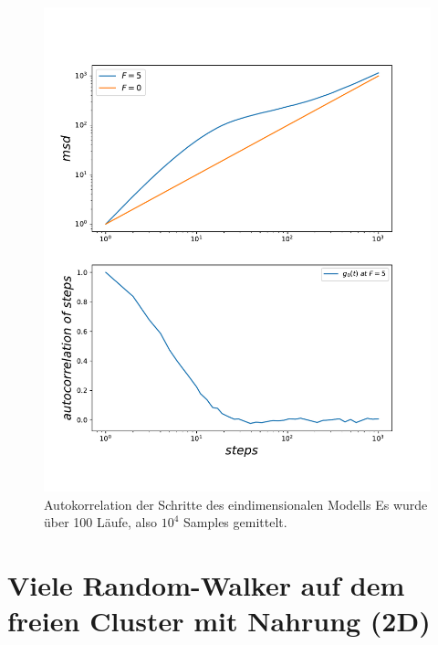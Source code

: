 \documentclass[a4paper, 12pt]{report}
\begin{document}
\begin{figure}[H]
	\centering
	\includegraphics[scale=0.7]{onedescp.pdf}
	\caption{Autokorrelation der Schritte des eindimensionalen Modells \break Es wurde über 100 Läufe, also $10^4$ Samples gemittelt.}
\end{figure}


\chapter{Viele Random-Walker auf dem freien Cluster mit Nahrung (2D)}
\end{document}

